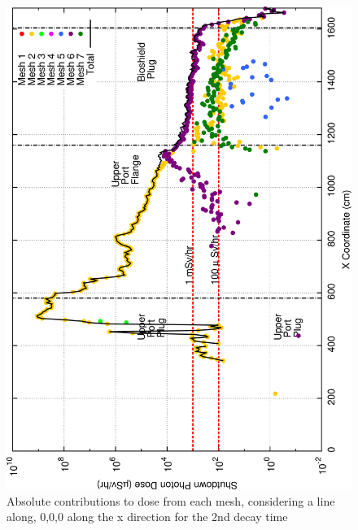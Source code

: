 \documentclass[12pt]{article}
\begin{document}
\begin{figure}[ht!]
\centering
\includegraphics[clip,scale=0.25]{../plots/crosstalk/b4c/up/dc2.png}
\caption{Absolute contributions to dose from each mesh, considering a line along, 0,0,0 along the x direction for the 2nd decay time}
\label{fig:b4c_ct_up_dc2}
\end{figure}
\end{document}
